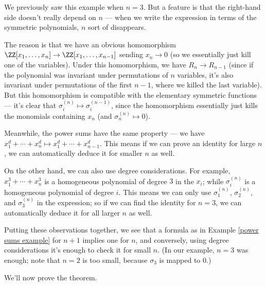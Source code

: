 We previously saw this example when $n = 3$. But a feature is that the right-hand side doesn't really depend on $n$ --- when we write the expression in terms of the symmetric polynomials, $n$ sort of disappears. 

The reason is that we have an obvious homomorphism $\ZZ[x_1, \ldots, x_n] \to \ZZ[x_1, \ldots, x_{n - 1}]$ sending $x_n \to 0$ (so we essentially just kill one of the variables). Under this homomorphism, we have $R_n \to R_{n - 1}$ (since if the polynomial was invariant under permutations of $n$ variables, it's also invariant under permutations of the first $n - 1$, where we killed the last variable). But this homomorphism is compatible with the elementary symmetric functions --- it's clear that $\sigma_i^{(n)} \mapsto \sigma_i^{(n - 1)}$, since the homomorphism essentially just kills the monomials containing $x_n$ (and $\sigma_n^{(n)} \mapsto 0$). 

Meanwhile, the power sums have the same property --- we have $x_1^d + \cdots + x_n^d \mapsto x_1^d + \cdots + x_{n - 1}^d$. This means if we can prove an identity for large $n$, we can automatically deduce it for smaller $n$ as well. 

On the other hand, we can also use degree considerations. For example, $x_1^3 + \cdots + x_n^3$ is a homogeneous polynomial of degree $3$ in the $x_i$; while $\sigma_i^{(n)}$ is a homogeneous polynomial of degree $i$. This means we can only use $\sigma_1^{(n)}$, $\sigma_2^{(n)}$, and $\sigma_3^{(n)}$ in the expression; so if we can find the identity for $n = 3$, we can automatically deduce it for all larger $n$ as well. 

Putting these observations together, we see that a formula as in Example \ref{power sums example} for $n + 1$ implies one for $n$, and conversely, using degree considerations it's enough to check it for small $n$. (In our example, $n = 3$ was enough; note that $n = 2$ is too small, because $\sigma_3$ is mapped to $0$.)

We'll now prove the theorem. 

